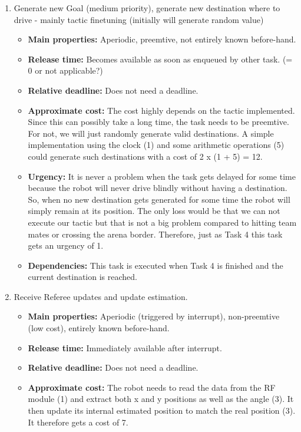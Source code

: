 \documentclass[12pt]{article}
\begin{document}
\begin{enumerate}
\begin{itemize}
   	\end{itemize} 	
  \item Generate new Goal (medium priority), generate new destination where to drive - mainly tactic finetuning (initially will generate random value)
  \begin{itemize}
  	\item \textbf{Main properties:} Aperiodic, preemtive, not entirely known before-hand.
  	\item \textbf{Release time:} Becomes available as soon as enqueued by other task. (= 0 or not applicable?)
  	\item \textbf{Relative deadline:} Does not need a deadline.
  	\item \textbf{Approximate cost:} The cost highly depends on the tactic implemented. Since this can possibly take a long time, the task needs to be preemtive. For not, we will just randomly generate valid destinations. A simple implementation using the clock (1) and some arithmetic operations (5) could generate such destinations with a cost of 2 x (1 + 5) = 12.
  	\item \textbf{Urgency:} It is never a problem when the task gets delayed for some time because the robot will never drive blindly without having a destination. So, when no new destination gets generated for some time the robot will simply remain at its position. The only loss would be that we can not execute our tactic but that is not a big problem compared to hitting team mates or crossing the arena border. Therefore, just as Task 4 this task gets an urgency of 1.
  	\item \textbf{Dependencies:} This task is executed when Task 4 is finished and the current destination is reached.
   	\end{itemize}
  \item Receive Referee updates and update estimation.
    \begin{itemize}
  	\item \textbf{Main properties:} Aperiodic (triggered by interrupt), non-preemtive (low cost), entirely known before-hand.
  	\item \textbf{Release time:} Immediately available after interrupt.
  	\item \textbf{Relative deadline:} Does not need a deadline.
  	\item \textbf{Approximate cost:} The robot needs to read the data from the RF module (1) and extract both x and y positions as well as the angle (3). It then update its internal estimated position to match the real position (3). It therefore gets a cost of 7.

\end{itemize}
\end{enumerate}
\end{document}
